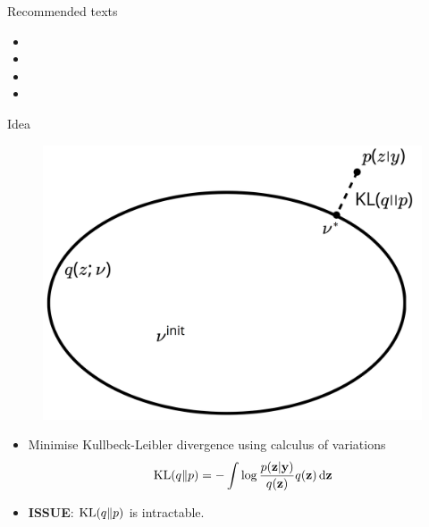 \begin{frame}{Recommended texts}
  \begin{itemize}
    \item {}
    \item {}
    \item {}
    \item {}
  \end{itemize}
\end{frame}

\begin{frame}{Idea}
  \vspace{-45pt}
  \begin{figure}[t]
    \includegraphics[scale=0.2]{figure/variational_pictorial}
  \end{figure}
  \vspace{-9pt}
  \begin{itemize}
    \item Minimise Kullbeck-Leibler divergence using calculus of variations
    \[
      \operatorname{KL}(q \Vert p) = -\int \log \frac{p({\mathbf z}|{\mathbf y})}{q({\mathbf z})} q({\mathbf z}) \, \text{d}{\mathbf z}
    \]
    \item \textbf{ISSUE}: $\operatorname{KL}(q\Vert p)$ is intractable.
  \end{itemize}
\end{frame}

